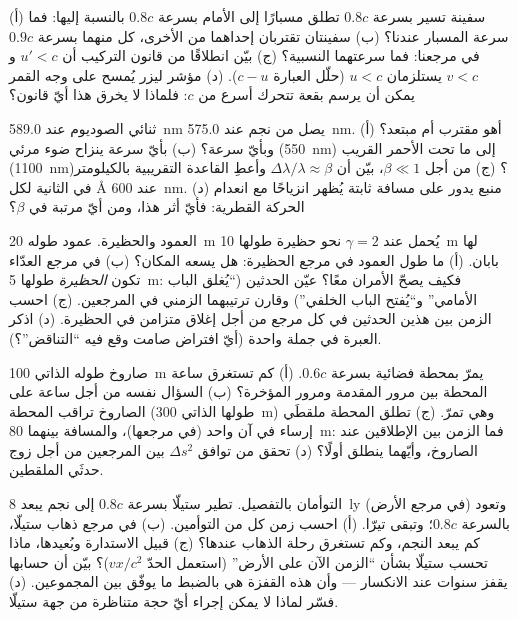 \begin{exercise}[$\star\star$]\label{exo:b3:relativistic-kinematics:6}
(أ) سفينة تسير بسرعة $0.8c$ تطلق مسبارًا إلى الأمام بسرعة $0.8c$
بالنسبة إليها: فما سرعة المسبار عندنا؟ (ب) سفينتان تقتربان
إحداهما من الأخرى، كل منهما بسرعة $0.9c$ في مرجعنا: فما سرعتهما
النسبية؟ (ج) بيّن انطلاقًا من قانون التركيب أن $u' < c$ و $v < c$
يستلزمان $u < c$ (حلّل العبارة $c - u$). (د) مؤشر ليزر يُمسح على
وجه القمر يمكن أن يرسم بقعة تتحرك أسرع من $c$: فلماذا لا يخرق
هذا أيّ قانون؟
\end{exercise}

\begin{exercise}[$\star\star$]\label{exo:b3:relativistic-kinematics:7}
ثنائي الصوديوم عند \qty{589.0}{nm} يصل من نجم عند
\qty{575.0}{nm}. (أ) أهو مقترب أم مبتعد؟ وبأيّ سرعة؟ (ب) بأيّ
سرعة ينزاح ضوء مرئي (\qty{550}{nm}) إلى ما تحت الأحمر
القريب (\qty{1100}{nm})؟ (ج) من أجل $\beta \ll 1$، بيّن أن
$\Delta\lambda/\lambda \approx \beta$ وأعطِ القاعدة التقريبية
بالكيلومتر في الثانية لكل \unit{\angstrom} عند \qty{600}{nm}. (د) منبع
يدور على مسافة ثابتة يُظهر انزياحًا مع انعدام الحركة القطرية:
فأيّ أثر هذا، ومن أيّ مرتبة في $\beta$؟
\end{exercise}

\begin{exercise}[$\star\star$]\label{exo:b3:relativistic-kinematics:8}
العمود والحظيرة. عمود طوله \qty{20}{m} يُحمل عند $\gamma = 2$
نحو حظيرة طولها \qty{10}{m} لها بابان. (أ) ما طول العمود في
مرجع الحظيرة: هل يسعه المكان؟ (ب) في مرجع العدّاء تكون
\emph{الحظيرة} طولها \qty{5}{m}: فكيف يصحّ الأمران معًا؟ عيّن
الحدثين (``يُغلق الباب الأمامي'' و``يُفتح الباب الخلفي'')
وقارن ترتيبهما الزمني في المرجعين. (ج) احسب الزمن بين هذين
الحدثين في كل مرجع من أجل إغلاق متزامن في الحظيرة. (د) اذكر
العبرة في جملة واحدة (أيّ افتراض صامت وقع فيه ``التناقض''؟).
\end{exercise}

\begin{exercise}[$\star\star$]\label{exo:b3:relativistic-kinematics:9}
صاروخ طوله الذاتي \qty{100}{m} يمرّ بمحطة فضائية بسرعة
$0.6c$. (أ) كم تستغرق ساعة المحطة بين مرور المقدمة ومرور
المؤخرة؟ (ب) السؤال نفسه من أجل ساعة على الصاروخ تراقب المحطة
(طولها الذاتي \qty{300}{m}) وهي تمرّ. (ج) تطلق المحطة ملقطَي
إرساء في آن واحد (في مرجعها)، والمسافة بينهما \qty{80}{m}: فما
الزمن بين الإطلاقين عند الصاروخ، وأيّهما ينطلق أولًا؟ (د) تحقق
من توافق $\Delta s^2$ بين المرجعين من أجل زوج حدثَي الملقطين.
\end{exercise}

\begin{exercise}[$\star\star\star$]\label{exo:b3:relativistic-kinematics:10}
التوأمان بالتفصيل. تطير ستيلّا بسرعة $0.8c$ إلى نجم يبعد \qty{8}{ly}
(في مرجع الأرض) وتعود بالسرعة $0.8c$؛ وتبقى تيرّا. (أ) احسب زمن
كل من التوأمين. (ب) في مرجع ذهاب ستيلّا، كم يبعد النجم، وكم
تستغرق رحلة الذهاب عندها؟ (ج) قبيل الاستدارة وبُعيدها، ماذا
تحسب ستيلّا بشأن ``الزمن الآن على الأرض'' (استعمل الحدّ $vx/c^2$)؟
بيّن أن حسابها يقفز سنوات عند الانكسار --- وأن هذه القفزة هي
بالضبط ما يوفّق بين المجموعين. (د) فسّر لماذا لا يمكن إجراء أيّ
حجة متناظرة من جهة ستيلّا.
\end{exercise}

